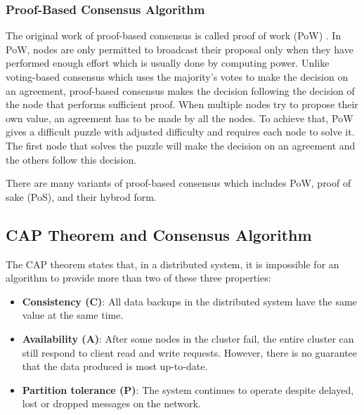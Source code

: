 \documentclass[12pt, a4paper]{article}
\begin{document}
\subsubsection{Proof-Based Consensus Algorithm}
The original work of proof-based consensus is called proof of work (PoW)
\cite{nakamoto2019bitcoin}. In PoW, nodes are only permitted to 
broadcast their proposal only when they have performed enough effort which
is usually done by computing power.
Unlike voting-based consensus which uses the majority's votes to 
make the decision on an agreement, proof-based consensus makes the decision 
following the decision of the node that performs sufficient proof.
When multiple nodes try to propose their own value, an agreement has to be made
by all the nodes. To achieve that, PoW gives a difficult puzzle with adjusted difficulty
and requires each node to solve it. The first node that solves the puzzle will make the
decision on an agreement and the others follow this decision.

There are many variants of proof-based consensus
which includes PoW, proof of sake (PoS), and their hybrod form. 

\subsection{CAP Theorem and Consensus Algorithm} 
\label{sec:cap-theorem}

The CAP theorem \cite{brewer2012cap} states that, in a distributed system, it is impossible for an algorithm to provide more than two of these three properties:

\begin{itemize}
	\item \textbf{Consistency (C)}: All data backups in the distributed system have
    the same value at the same time.
	\item \textbf{Availability (A)}: After some nodes in the cluster fail, the entire
    cluster can still respond to client read and write requests. However, there
    is no guarantee that the data produced is most up-to-date.
	\item \textbf{Partition tolerance (P)}: The system continues to operate despite
    delayed, lost or dropped messages on the network.
\end{itemize}
\end{document}
